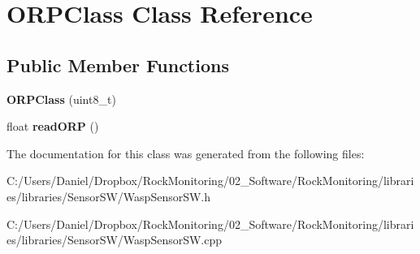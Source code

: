 \hypertarget{class_o_r_p_class}{}\section{O\+R\+P\+Class Class Reference}
\label{class_o_r_p_class}
\subsection*{Public Member Functions}
\begin{DoxyCompactItemize}
\item 
{\bfseries O\+R\+P\+Class} (uint8\+\_\+t)\hypertarget{class_o_r_p_class_a464226d31e4a706fb4432991df3125c5}{}\label{class_o_r_p_class_a464226d31e4a706fb4432991df3125c5}

\item 
float {\bfseries read\+O\+RP} ()\hypertarget{class_o_r_p_class_a4c355d95e11db3ba9d750a500b34d7b1}{}\label{class_o_r_p_class_a4c355d95e11db3ba9d750a500b34d7b1}

\end{DoxyCompactItemize}


The documentation for this class was generated from the following files\+:\begin{DoxyCompactItemize}
\item 
C\+:/\+Users/\+Daniel/\+Dropbox/\+Rock\+Monitoring/02\+\_\+\+Software/\+Rock\+Monitoring/libraries/libraries/\+Sensor\+S\+W/Wasp\+Sensor\+S\+W.\+h\item 
C\+:/\+Users/\+Daniel/\+Dropbox/\+Rock\+Monitoring/02\+\_\+\+Software/\+Rock\+Monitoring/libraries/libraries/\+Sensor\+S\+W/Wasp\+Sensor\+S\+W.\+cpp\end{DoxyCompactItemize}
